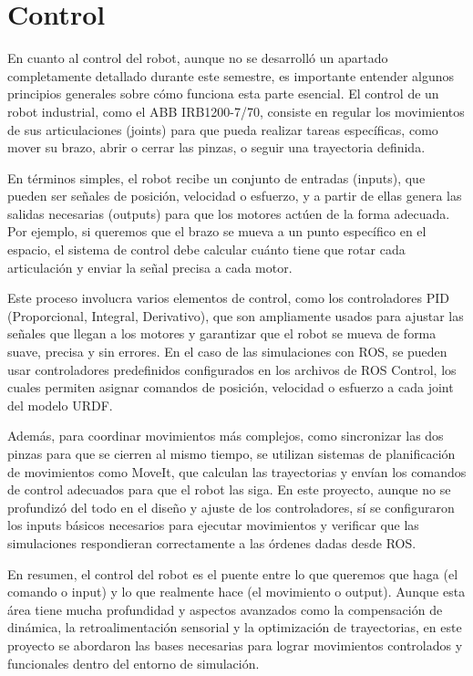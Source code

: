 \section{Control} \label{sec:control}
En cuanto al control del robot, aunque no se desarrolló un apartado completamente detallado durante este semestre, es importante entender algunos principios generales sobre cómo funciona esta parte esencial. El control de un robot industrial, como el ABB IRB1200-7/70, consiste en regular los movimientos de sus articulaciones (joints) para que pueda realizar tareas específicas, como mover su brazo, abrir o cerrar las pinzas, o seguir una trayectoria definida.

En términos simples, el robot recibe un conjunto de entradas (inputs), que pueden ser señales de posición, velocidad o esfuerzo, y a partir de ellas genera las salidas necesarias (outputs) para que los motores actúen de la forma adecuada. Por ejemplo, si queremos que el brazo se mueva a un punto específico en el espacio, el sistema de control debe calcular cuánto tiene que rotar cada articulación y enviar la señal precisa a cada motor.

Este proceso involucra varios elementos de control, como los controladores PID (Proporcional, Integral, Derivativo), que son ampliamente usados para ajustar las señales que llegan a los motores y garantizar que el robot se mueva de forma suave, precisa y sin errores. En el caso de las simulaciones con ROS, se pueden usar controladores predefinidos configurados en los archivos de ROS Control, los cuales permiten asignar comandos de posición, velocidad o esfuerzo a cada joint del modelo URDF.

Además, para coordinar movimientos más complejos, como sincronizar las dos pinzas para que se cierren al mismo tiempo, se utilizan sistemas de planificación de movimientos como MoveIt, que calculan las trayectorias y envían los comandos de control adecuados para que el robot las siga. En este proyecto, aunque no se profundizó del todo en el diseño y ajuste de los controladores, sí se configuraron los inputs básicos necesarios para ejecutar movimientos y verificar que las simulaciones respondieran correctamente a las órdenes dadas desde ROS.

En resumen, el control del robot es el puente entre lo que queremos que haga (el comando o input) y lo que realmente hace (el movimiento o output). Aunque esta área tiene mucha profundidad y aspectos avanzados como la compensación de dinámica, la retroalimentación sensorial y la optimización de trayectorias, en este proyecto se abordaron las bases necesarias para lograr movimientos controlados y funcionales dentro del entorno de simulación.
